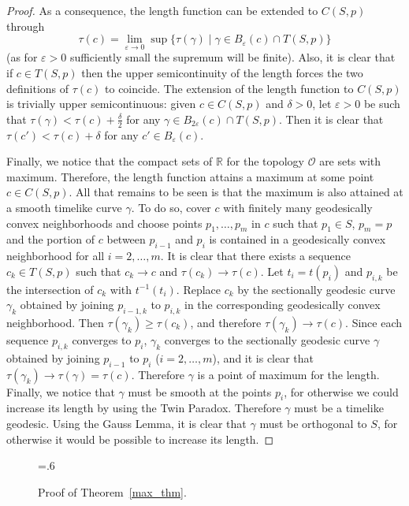 \documentclass[10pt]{amsart}
\newcommand{\bbR}{\mathbb{R}}      %
\newcommand{\cT}{\mathcal{T}}
\theoremstyle{definition}
\theoremstyle{remark}
\begin{document}
\begin{proof}
As a consequence, the length function can be extended to $C(S,p)$ through
\[
\tau(c)=\lim_{\varepsilon \to 0} \sup\{ \tau(\gamma) \mid \gamma \in B_\varepsilon(c) \cap T(S,p) \}
\]
(as for $\varepsilon>0$ sufficiently small the supremum will be finite). Also, it is clear that if $c \in T(S,p)$ then the upper semicontinuity of the length forces the two definitions of $\tau(c)$ to coincide. The extension of the length function to $C(S,p)$ is trivially upper semicontinuous: given $c \in C(S,p)$ and $\delta > 0$, let $\varepsilon>0$ be such that $\tau(\gamma) < \tau(c) + \frac{\delta}2$ for any $\gamma \in B_{2\varepsilon}(c) \cap T(S,p)$. Then it is clear that $\tau(c') < \tau(c) + \delta$ for any $c' \in B_{\varepsilon}(c)$.

Finally, we notice that the compact sets of $\bbR$ for the topology $\mathcal{O}$ are sets with maximum. Therefore, the length function attains a maximum at some point $c \in C(S,p)$. All that remains to be seen is that the maximum is also attained at a smooth timelike curve $\gamma$. To do so, cover $c$ with finitely many geodesically convex neighborhoods and choose points $p_1, \ldots, p_m$ in $c$ such that $p_1 \in S$, $p_m=p$ and the portion of $c$ between $p_{i-1}$ and $p_{i}$ is contained in a geodesically convex neighborhood for all $i=2, \ldots, m$. It is clear that there exists a sequence $c_k \in T(S,p)$ such that $c_k \to c$ and $\tau(c_k) \to \tau(c)$. Let $t_i=t(p_i)$ and $p_{i,k}$ be the intersection of $c_k$ with $t^{-1}(t_i)$. Replace $c_k$ by the sectionally geodesic curve $\gamma_k$ obtained by joining $p_{i-1,k}$ to $p_{i,k}$ in the corresponding geodesically convex neighborhood. Then $\tau(\gamma_k) \geq \tau(c_k)$, and therefore $\tau(\gamma_k) \to \tau(c)$. Since each sequence $p_{i,k}$ converges to $p_i$, $\gamma_k$ converges to the sectionally geodesic curve $\gamma$ obtained by joining $p_{i-1}$ to $p_{i}$ ($i=2, \ldots, m$), and it is clear that $\tau(\gamma_k) \to \tau(\gamma)=\tau(c)$. Therefore $\gamma$ is a point of maximum for the length. Finally, we notice that $\gamma$ must be smooth at the points $p_i$, for otherwise we could increase its length by using the Twin Paradox. Therefore $\gamma$ must be a timelike geodesic. Using the Gauss Lemma, it is clear that $\gamma$ must be orthogonal to $S$, for otherwise it would be possible to increase its length.
\end{proof}

\begin{figure}[h!]
\begin{center}
\psfrag{u=0}{$\cT=0$}
\psfrag{u=t(c)}{$\cT=\tau(c)$}
\epsfxsize=.6\textwidth
\leavevmode
{}
\end{center}
\caption{Proof of Theorem~\ref{max_thm}.} \label{Figure_semi}
\end{figure}
\end{document}
